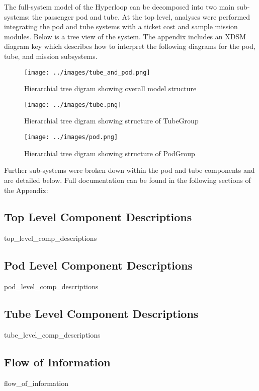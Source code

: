The full-system model of the Hyperloop can be decomposed into two main
sub-systems: the passenger pod and tube. At the top level, analyses were
performed integrating the pod and tube systems with a ticket cost  and sample
mission modules. Below is a tree view of the system.
The appendix includes an XDSM diagram key which describes how to interpret
the following diagrams for the pod, tube, and mission subsystems.

\begin{figure}
	\centering
	\texttt{[image: ../images/tube\_and\_pod.png]}
	\caption{Hierarchial tree digram showing overall model structure}
	\label{fig:tree:tube_and_pod}
\end{figure}

\begin{figure}
	\centering
	\texttt{[image: ../images/tube.png]}
	\caption{Hierarchial tree digram showing structure of TubeGroup}
	\label{fig:tree:tube}
\end{figure}

\begin{figure}
	\centering
	\texttt{[image: ../images/pod.png]}
	\caption{Hierarchial tree digram showing structure of PodGroup}
	\label{fig:tube}
\end{figure}

Further sub-systems were broken down within the pod and tube components and are detailed below.
Full documentation can be found in the following sections of the Appendix:

\subsection{Top Level Component Descriptions}
	{top_level_comp_descriptions}
\subsection{Pod Level Component Descriptions}
	{pod_level_comp_descriptions}
\subsection{Tube Level Component Descriptions}
	{tube_level_comp_descriptions}
\subsection{Flow of Information}
	{flow_of_information}


